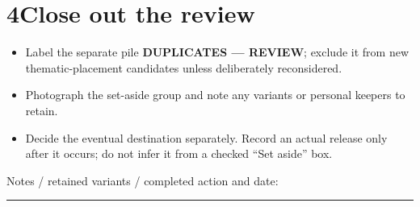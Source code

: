 \documentclass[10pt,a4paper]{article}
\newcommand{\linefill}{\rule{\linewidth}{0.3pt}}
\begin{document}
\section{4\quad Close out the review}
\begin{itemize}
\item Label the separate pile \textbf{DUPLICATES --- REVIEW}; exclude it from new thematic-placement candidates unless deliberately reconsidered.
\item Photograph the set-aside group and note any variants or personal keepers to retain.
\item Decide the eventual destination separately. Record an actual release only after it occurs; do not infer it from a checked ``Set aside'' box.
\end{itemize}
Notes / retained variants / completed action and date: \hrulefill\par\linefill
\end{document}
